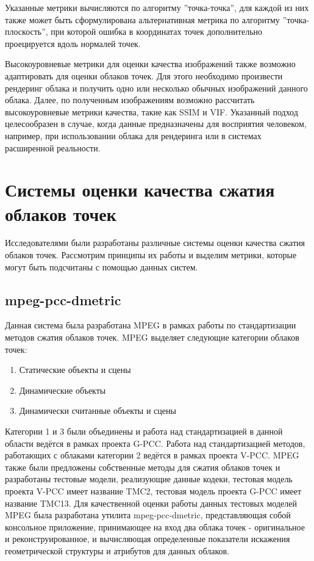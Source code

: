 Указанные метрики вычисляются по алгоритму ''точка-точка'', для каждой из них
также может быть сформулирована альтернативная метрика по алгоритму
''точка-плоскость'', при которой ошибка в координатах точек дополнительно
проецируется вдоль нормалей точек.


Высокоуровневые метрики для оценки качества изображений также возможно
адаптировать для оценки облаков точек. Для этого необходимо произвести рендеринг
облака и получить одно или несколько обычных изображений данного облака. Далее,
по полученным изображениям возможно рассчитать высокоуровневые метрики качества,
такие как SSIM и VIF. Указанный подход целесообразен в случае, когда данные
предназначены для восприятия человеком, например, при использовании облака для
рендеринга или в системах расширенной реальности.

\section{Системы оценки качества сжатия облаков точек}

Исследователями были разработаны различные системы оценки качества сжатия
облаков точек. Рассмотрим принципы их работы и выделим метрики, которые могут
быть подсчитаны с помощью данных систем.

\subsection{mpeg-pcc-dmetric}

Данная система была разработана MPEG в рамках работы по стандартизации методов
сжатия облаков точек. MPEG выделяет следующие категории облаков
точек\cite{CallForProposalV2}:

\begin{enumerate}
    \item Статические объекты и сцены
    \item Динамические объекты
    \item Динамически считанные объекты и сцены
\end{enumerate}


Категории 1 и 3 были объединены и работа над стандартизацией в данной области
ведётся в рамках проекта G-PCC. Работа над стандартизацией методов, работающих с
облаками категории 2 ведётся в рамках проекта V-PCC. MPEG также были предложены
собственные методы для сжатия облаков точек и разработаны тестовые модели,
реализующие данные кодеки, тестовая модель проекта V-PCC имеет название TMC2,
тестовая модель проекта G-PCC имеет название TMC13. Для качественной оценки
работы данных тестовых моделей MPEG была разработана утилита mpeg-pcc-dmetric,
представляющая собой консольное приложение, принимающее на вход два облака точек
- оригинальное и реконструированное, и вычисляющая определенные показатели
искажения геометрической структуры и атрибутов для данных облаков.

